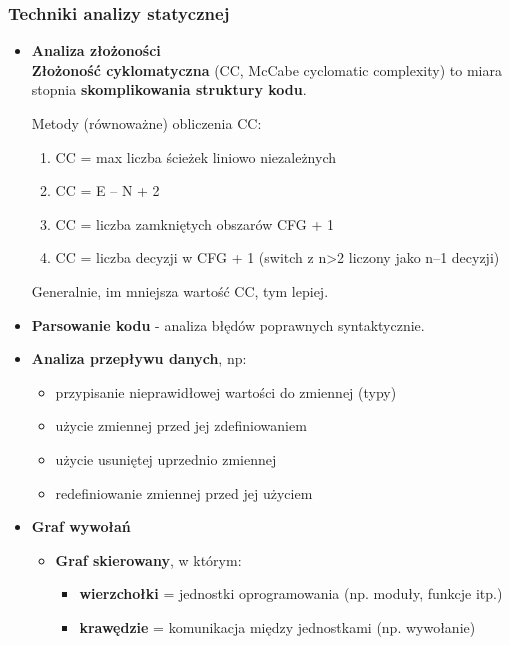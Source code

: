 \documentclass[../main.tex]{subfiles}
\begin{document}
    \subsubsection{Techniki analizy statycznej}
    \begin{itemize}
        \item \textbf{Analiza złożoności}\\
        \textbf{Złożoność cyklomatyczna} (CC, McCabe cyclomatic complexity) to miara stopnia \textbf{skomplikowania struktury kodu}.

        Metody (równoważne) obliczenia CC:
        \begin{enumerate}
            \item CC = max liczba ścieżek liniowo niezależnych
            \item CC = E – N + 2
            \item CC = liczba zamkniętych obszarów CFG + 1
            \item CC = liczba decyzji w CFG + 1
            (switch z n>2 liczony jako n–1 decyzji)
        \end{enumerate}
        Generalnie, im mniejsza wartość CC, tym lepiej.

        \item \textbf{Parsowanie kodu} - analiza błędów poprawnych syntaktycznie.
        \item \textbf{Analiza przepływu danych}, np:
        \begin{itemize}
            \item przypisanie nieprawidłowej wartości do zmiennej (typy)
            \item użycie zmiennej przed jej zdefiniowaniem
            \item użycie usuniętej uprzednio zmiennej
            \item redefiniowanie zmiennej przed jej użyciem
        \end{itemize}


        \item \textbf{Graf wywołań}
        \begin{itemize}
            \item \textbf{Graf skierowany}, w którym:
            \begin{itemize}
                \item \textbf{wierzchołki} = jednostki oprogramowania (np. moduły, funkcje itp.)
                \item \textbf{krawędzie} = komunikacja między jednostkami (np. wywołanie)
            \end{itemize}


\end{itemize}
\end{itemize}
\end{document}
